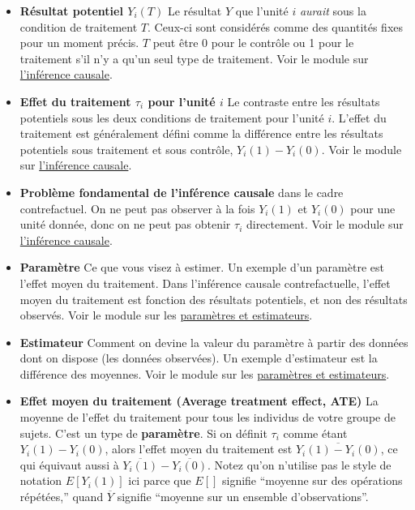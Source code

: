 \documentclass[
  12pt,
]{book}
\begin{document}
\begin{itemize}
\item
  \textbf{Résultat potentiel \(Y_i(T)\)} Le résultat \(Y\) que l'unité \(i\) \emph{aurait} sous la condition de traitement \(T\). Ceux-ci sont considérés comme des quantités fixes pour un moment précis.
  \(T\) peut être 0 pour le contrôle ou 1 pour le traitement s'il n'y a qu'un seul type de traitement. Voir le module sur \href{inférence-causale.html}{l'inférence causale}.
\item
  \textbf{Effet du traitement \(\tau_i\) pour l'unité \(i\)} Le contraste entre les résultats potentiels sous les deux conditions de traitement pour l'unité \(i\).
  L'effet du traitement est généralement défini comme la différence entre les résultats potentiels sous traitement et sous contrôle, \(Y_i(1)-Y_i(0)\).
  Voir le module sur \href{inférence-causale.html}{l'inférence causale}.
\item
  \textbf{Problème fondamental de l'inférence causale} dans le cadre contrefactuel. On ne peut pas observer à la fois \(Y_i(1)\) et \(Y_i(0)\) pour une unité donnée, donc on ne peut pas obtenir \(\tau_i\) directement.
  Voir le module sur \href{inférence-causale.html}{l'inférence causale}.
\item
  \textbf{Paramètre} Ce que vous visez à estimer. Un exemple d'un paramètre est l'effet moyen du traitement.
  Dans l'inférence causale contrefactuelle, l'effet moyen du traitement est fonction des résultats potentiels, et non des résultats observés.
  Voir le module sur les \href{paramètres-et-estimateurs.html}{paramètres et estimateurs}.
\item
  \textbf{Estimateur} Comment on devine la valeur du paramètre à partir des données dont on dispose (les données observées).
  Un exemple d'estimateur est la différence des moyennes. Voir le module sur les \href{paramètres-et-estimateurs.html}{paramètres et estimateurs}.
\item
  \textbf{Effet moyen du traitement (Average treatment effect, ATE)} La moyenne de l'effet du traitement pour tous les individus de votre groupe de sujets.
  C'est un type de \textbf{paramètre}. Si on définit \(\tau_i\) comme étant \(Y_i(1)-Y_i(0)\), alors l'effet moyen du traitement est \(\overline{Y_i(1)-Y_i(0)}\), ce qui équivaut aussi à \(\overline{{Y}_i(1)}-\overline{{Y}_i(0)}\).
  Notez qu'on n'utilise pas le style de notation \(E[Y_i (1)]\) ici parce que \(E[]\) signifie ``moyenne sur des opérations répétées,'' quand \(\overline{Y}\) signifie ``moyenne sur un ensemble d'observations''.

\end{itemize}
\end{document}
